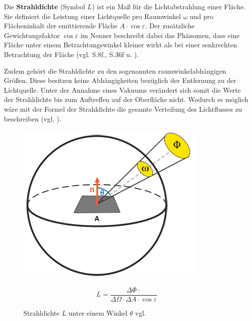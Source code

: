 \documentclass[
  11pt,
  a4paper,
  oneside
  ]{article}
\begin{document}
Die \textbf{Strahldichte} (Symbol $L$) ist ein Maß für die Lichtabstrahlung einer Fläche. Sie definiert die Leistung einer Lichtquelle pro Raumwinkel $\omega$ und pro Flächeninhalt der emittierende Fläche $A\cdot \cos \varepsilon$. Der zusätzliche Gewichtungsfaktor $\cos \varepsilon$ im Nenner beschreibt dabei das Phänomen, dass eine Fläche unter einem Betrachtungswinkel kleiner wirkt als bei einer senkrechten Betrachtung der Fläche 
(vgl. S.8f.\cite{GrundlagenLichtTechnik}, S.36f \cite{radiometrischeGrundbegriffe} u. \cite{vgb,learnOpenGL}).

Zudem gehört die Strahldichte zu den sogenannten raumwinkelabhängigen Größen. Diese besitzen keine Abhängigkeiten bezüglich der Entfernung zu der Lichtquelle. Unter der Annahme eines Vakuums verändert sich somit die Werte der Strahldichte bis zum Auftreffen auf der Oberfläche nicht. Wodurch es möglich wäre mit der Formel der Strahldichte die gesamte Verteilung des Lichtflusses zu beschreiben
(vgl. \cite{gMueller}). 
\begin{figure}[H]
  \centering
  \begin{minipage}{.5\textwidth}
    \centering
    \includegraphics*[width=0.7 \linewidth]{images/radiance.png}
    \caption{Strahldichte $L$ unter einem Winkel $\theta$ vgl. \cite{learnOpenGL}}
    \label{fig:img4}
  \end{minipage}%
  \hfill
  \begin{minipage}{.5\textwidth}
    \begin{equation}
      L=\dfrac{\Delta \Phi \cdot }{\Delta \Omega \cdot \Delta A\cdot \cos \varepsilon } 
    \end{equation}
  \end{minipage}
\end{figure}
\end{document}
